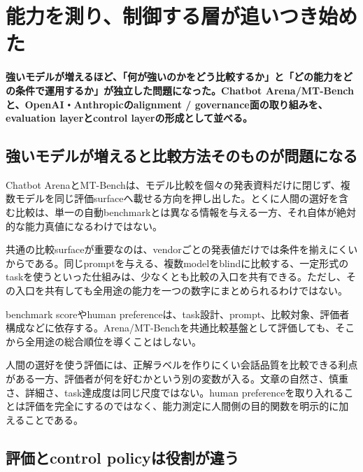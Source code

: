 \section{能力を測り、制御する層が追いつき始めた}
\noindent\textbf{強いモデルが増えるほど、「何が強いのかをどう比較するか」と「どの能力をどの条件で運用するか」が独立した問題になった。Chatbot Arena/MT-Benchと、OpenAI・Anthropicのalignment / governance面の取り組みを、evaluation layerとcontrol layerの形成として並べる。}\autocite{src-14f8acc117f1,src-1df7a91d31ec,src-25adcaa1c831,src-394ea6d17701,src-8f63dfa1697f,src-a1c8df89a3c9,src-b276b4af9d56,src-b2d10cbd609c,src-b6a5fdb87e9f}

\subsection{強いモデルが増えると比較方法そのものが問題になる}

Chatbot ArenaとMT-Benchは、モデル比較を個々の発表資料だけに閉じず、複数モデルを同じ評価surfaceへ載せる方向を押し出した。とくに人間の選好を含む比較は、単一の自動benchmarkとは異なる情報を与える一方、それ自体が絶対的な能力真値になるわけではない。\autocite{src-14f8acc117f1,src-1df7a91d31ec,src-b2d10cbd609c}


共通の比較surfaceが重要なのは、vendorごとの発表値だけでは条件を揃えにくいからである。同じpromptを与える、複数modelをblindに比較する、一定形式のtaskを使うといった仕組みは、少なくとも比較の入口を共有できる。ただし、その入口を共有しても全用途の能力を一つの数字にまとめられるわけではない。\autocite{src-14f8acc117f1,src-1df7a91d31ec,src-b2d10cbd609c}


benchmark scoreやhuman preferenceは、task設計、prompt、比較対象、評価者構成などに依存する。Arena/MT-Benchを共通比較基盤として評価しても、そこから全用途の総合順位を導くことはしない。\autocite{src-14f8acc117f1,src-1df7a91d31ec,src-b2d10cbd609c}


人間の選好を使う評価には、正解ラベルを作りにくい会話品質を比較できる利点がある一方、評価者が何を好むかという別の変数が入る。文章の自然さ、慎重さ、詳細さ、task達成度は同じ尺度ではない。human preferenceを取り入れることは評価を完全にするのではなく、能力測定に人間側の目的関数を明示的に加えることである。\autocite{src-14f8acc117f1,src-1df7a91d31ec,src-b2d10cbd609c}


\subsection{評価とcontrol policyは役割が違う}


